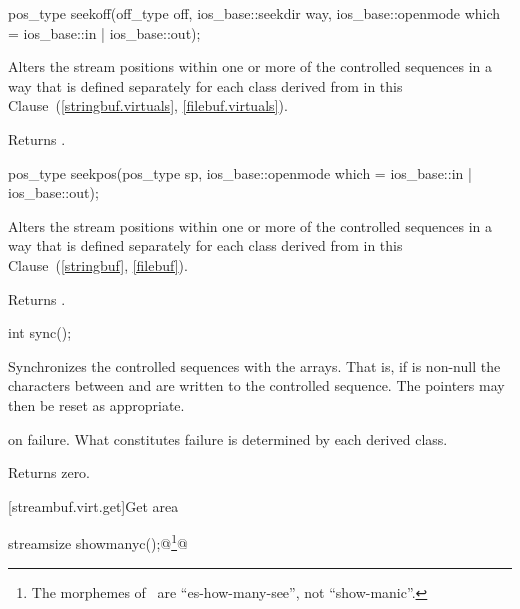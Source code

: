 %
\begin{itemdecl}
pos_type seekoff(off_type off, ios_base::seekdir way,
                 ios_base::openmode which
                  = ios_base::in | ios_base::out);
\end{itemdecl}

\begin{itemdescr}
\pnum
\effects
Alters the stream positions within one or more of
the controlled sequences in a way that is defined separately for each class
derived from
in this Clause~(\ref{stringbuf.virtuals},
\ref{filebuf.virtuals}).

\pnum
{}
Returns
.
\end{itemdescr}

%
\begin{itemdecl}
pos_type seekpos(pos_type sp,
                 ios_base::openmode which
                  = ios_base::in | ios_base::out);
\end{itemdecl}

\begin{itemdescr}
\pnum
\effects
Alters the stream positions within one or more of
the controlled sequences in a way that is defined separately for each class
derived from
in this Clause~(\ref{stringbuf},
\ref{filebuf}).

\pnum
{}
Returns
.
\end{itemdescr}

%
\begin{itemdecl}
int sync();
\end{itemdecl}

\begin{itemdescr}
\pnum
\effects
Synchronizes the controlled sequences with the arrays.
That is, if
is non-null the characters between
and
are written to the controlled sequence.
The pointers may then be reset as appropriate.

\pnum
\returns
{} on failure.
What constitutes failure is determined by each derived class.

\pnum
{}
Returns zero.
\end{itemdescr}

[streambuf.virt.get]{Get area}

\begin{indexed}{}
\begin{itemdecl}
streamsize showmanyc();@\footnote{\textrm{The morphemes of \
are ``es-how-many-see'', not ``show-manic''.}}@
\end{itemdecl}
\end{indexed}


